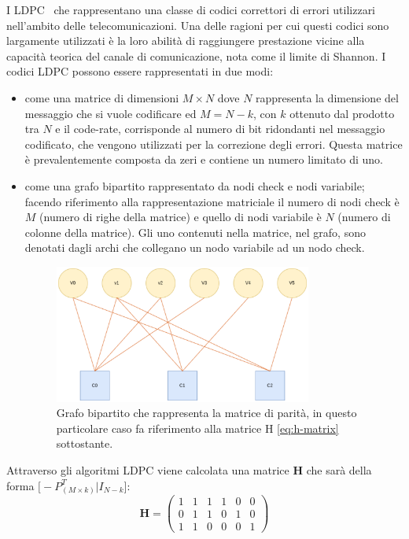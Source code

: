 I LDPC~\cite{borwankar_low_nodate} che rappresentano una classe di codici correttori di errori utilizzari nell'ambito delle telecomunicazioni. Una delle ragioni per cui questi codici sono largamente utilizzati \`e la loro abilit\`a di raggiungere prestazione vicine alla capacit\`a teorica del canale di comunicazione, nota come il limite di Shannon. I codici LDPC possono essere rappresentati in due modi:
\begin{itemize}
\item come una matrice di dimensioni $M \times N$ dove $N$ rappresenta la dimensione del messaggio che si vuole codificare ed $M = N - k$, con $k$ ottenuto dal prodotto tra $N$ e il code-rate, corrisponde al numero di bit ridondanti nel messaggio codificato, che vengono utilizzati per la correzione degli errori. Questa matrice \`e prevalentemente composta da zeri e contiene un numero limitato di uno.
\item come una grafo bipartito rappresentato da nodi check e nodi variabile; facendo riferimento alla rappresentazione matriciale il numero di nodi check \`e $M$ (numero di righe della matrice) e quello di nodi variabile \`e $N$ (numero di colonne della matrice). Gli uno contenuti nella matrice, nel grafo, sono denotati dagli archi che collegano un nodo variabile ad un nodo check.
\begin{figure}[H] 
\begin{center}
\includegraphics[width=0.8\textwidth]{figure/tanner_graph.eps} 
\end{center}
\caption[Grafo bipartito]{Grafo bipartito che rappresenta la matrice di parit\`a, in questo particolare caso fa riferimento alla matrice H \ref{eq:h-matrix} sottostante.}
\end{figure}
\end{itemize}

Attraverso gli algoritmi LDPC viene calcolata una matrice \textbf{H} che sar\`a della forma $\bigl [ -P^T_{(M \times k)} | I_{N-k}\bigr ]$:
\begin{equation} \label{eq:h-matrix}
\textbf{H} =
\begin{pmatrix}
 1 & 1 & 1 & 1 & 0 & 0 \\
 0 & 1 & 1 & 0 & 1 & 0 \\
 1 & 1 & 0 & 0 & 0 & 1
\end{pmatrix}
\end{equation}


